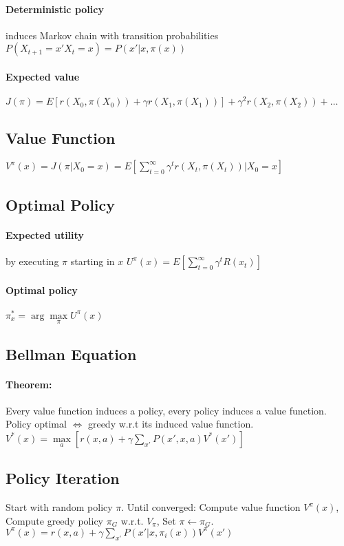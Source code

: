 \begin{multicols}{4}
\paragraph{Deterministic policy} induces Markov chain with transition probabilities $P(X_{t+1} = x'  X_t = x) = P(x'|x,\pi(x))$
\paragraph{Expected value} $J(\pi) = E[r(X_0,\pi(X_0)) + \gamma r(X_1, \pi(X_1))] + \gamma^2 r(X_2, \pi(X_2)) + \dots$

\subsection{Value Function}
$V^{\pi}(x) = J(\pi | X_0 = x) = E\left[\sum\limits_{t=0}^{\infty} \gamma^tr(X_t,\pi(X_t)) | X_0 = x\right]$

\subsection{Optimal Policy}
\paragraph{Expected utility} by executing $\pi$ starting in $x$ $U^\pi(x) = E \left[ \sum\limits_{t=0}^{\infty} \gamma^tR(x_t) \right]$
\paragraph{Optimal policy} $\pi^*_x = \arg\!\max\limits_\pi U^\pi(x)$

\subsection{Bellman Equation}
\paragraph{Theorem:} Every value function induces a policy, every policy induces a value function.
Policy optimal $\Leftrightarrow$ greedy w.r.t its induced value function.
$V^*(x) = \max\limits_{a}\left[r(x,a) + \gamma \sum\limits_{x'}P(x', x,a) V^*(x')\right]$

\subsection{Policy Iteration}
Start with random policy $\pi$. Until converged: Compute value function $V^{\pi}(x)$, Compute greedy policy $\pi_G$ w.r.t. $V_{\pi}$, Set $\pi \leftarrow \pi_G$.
$V^{\pi}(x) = r(x, a) + \gamma \sum\limits_{x'} P(x'|x,\pi_i(x))V^{\pi}(x')$

\end{multicols}
